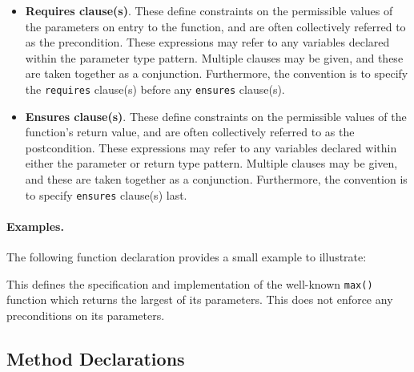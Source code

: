 \begin{itemize}

\item {\bf Requires clause(s)}. These define constraints on the permissible values of the parameters on entry to the function, and are often collectively referred to as the \gls{precondition}. These expressions may refer to any variables declared within the parameter type pattern. Multiple clauses may be given, and these are taken together as a conjunction. Furthermore, the convention is to specify the \lstinline{requires} clause(s) before any \lstinline{ensures} clause(s).

\item {\bf Ensures clause(s)}. These define constraints on the permissible values of the function's return value, and are often collectively referred to as the \gls{postcondition}. These expressions may refer to any variables declared within either the parameter or return type pattern.  Multiple clauses may be given, and these are taken together as a conjunction. Furthermore, the convention is to specify \lstinline{ensures} clause(s) last.
\end{itemize}

\paragraph{Examples.}
The following function declaration provides a small example to
illustrate:



This defines the specification and implementation of the well-known
\lstinline{max()} function which returns the largest of its
parameters. This does not enforce any preconditions on its parameters.


\subsection{Method Declarations}
\label{c_source_files_method_decl}

